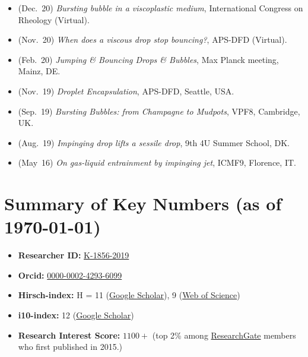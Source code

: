 \documentclass[10pt,a4paper,colorlinks,linkcolor=blue,urlcolor=blue,citecolor=blue]{moderncv}
\begin{document}
\begin{itemize}[leftmargin=1.5em]
\item[\textbullet] (Dec.~20) \emph{Bursting bubble in a viscoplastic medium}, International Congress on Rheology (Virtual). \href{https://youtu.be/52D6nfaHbYg?si=lE3oQGiMZe3UCT6j}{\color{red}\faYoutube}
\item[\textbullet] (Nov.~20) \emph{When does a viscous drop stop bouncing?}, APS-DFD (Virtual). \href{https://youtu.be/9JCV9JFwr2A?si=Vs1ljwdmZrzHUOXX}{\color{red}\faYoutube}
\item[\textbullet] (Feb.~20) \emph{Jumping \& Bouncing Drops \& Bubbles}, Max Planck meeting, Mainz, DE.
\item[\textbullet] (Nov.~19) \emph{Droplet Encapsulation}, APS-DFD, Seattle, USA.
\item[\textbullet] (Sep.~19) \emph{Bursting Bubbles: from Champagne to Mudpots}, VPF8, Cambridge, UK.
\item[\textbullet] (Aug.~19) \emph{Impinging drop lifts a sessile drop}, 9th 4U Summer School, DK.
\item[\textbullet] (May~16) \emph{On gas-liquid entrainment by impinging jet}, ICMF9, Florence, IT.
\end{itemize}

\section{Summary of Key Numbers (as of \today)}
\begin{itemize}[leftmargin=1.5em]
\item \faIdCard\hspace{0.3em}\textbf{Researcher ID:} \href{https://www.webofscience.com/wos/author/record/K-1856-2019}{K-1856-2019}
\item \faOrcid\hspace{0.3em}\textbf{Orcid:} \href{https://orcid.org/0000-0002-4293-6099}{0000-0002-4293-6099}
\item \faChartLine\hspace{0.3em}\textbf{Hirsch-index:} H = 11 (\href{https://scholar.google.com/citations?hl=en&user=tHb_qZoAAAAJ}{Google Scholar}), 9 (\href{https://www.webofscience.com/wos/author/record/K-1856-2019}{Web of Science})
\item \faFile\hspace{0.3em}\textbf{i10-index:} 12 (\href{https://scholar.google.com/citations?hl=en&user=tHb_qZoAAAAJ}{Google Scholar})
\item \faUsers\hspace{0.3em}\textbf{Research Interest Score:} \(1100+\) (top 2\% among \href{https://www.researchgate.net/profile/Vatsal-Sanjay-2}{ResearchGate} members who first published in 2015.)
\end{itemize}

\end{document}
